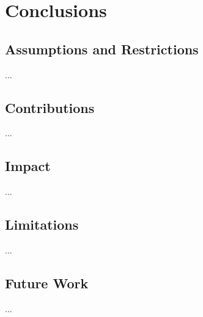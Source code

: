 

\chapter{Conclusions}\label{ch:conclusion}

\graphicspath{{conclusion/figures/}}


\section{Assumptions and Restrictions}
...

\section{Contributions}
...

\section{Impact}
...

\section{Limitations}
...

\section{Future Work}
...

